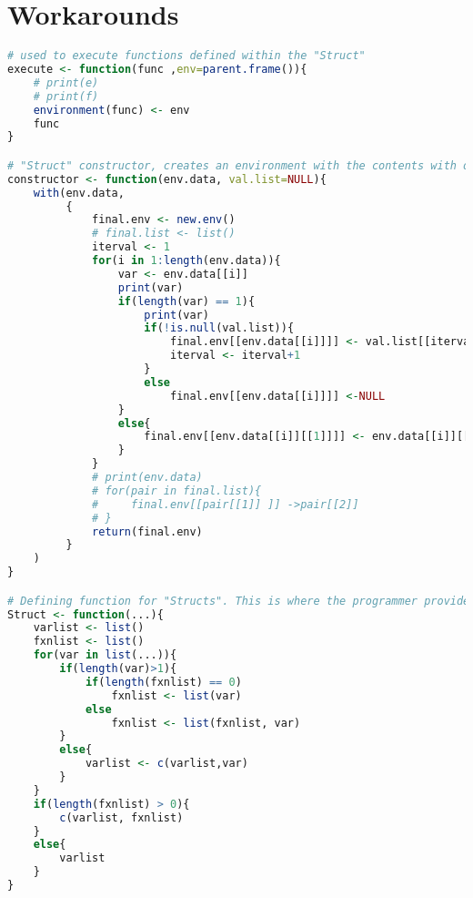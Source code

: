 \documentclass[12pt]{article}
\begin{document}
\section{Workarounds}
\begin{lstlisting}[language=R, frame=none]
# used to execute functions defined within the "Struct"
execute <- function(func ,env=parent.frame()){
    # print(e)
    # print(f)
    environment(func) <- env
    func
}

# "Struct" constructor, creates an environment with the contents with or without values
constructor <- function(env.data, val.list=NULL){
    with(env.data,
         {
             final.env <- new.env()
             # final.list <- list()
             iterval <- 1
             for(i in 1:length(env.data)){
                 var <- env.data[[i]]
                 print(var)
                 if(length(var) == 1){
                     print(var)
                     if(!is.null(val.list)){
                         final.env[[env.data[[i]]]] <- val.list[[iterval]]
                         iterval <- iterval+1
                     }
                     else
                         final.env[[env.data[[i]]]] <-NULL
                 }
                 else{
                     final.env[[env.data[[i]][[1]]]] <- env.data[[i]][[2]]
                 }
             }
             # print(env.data)
             # for(pair in final.list){
             #     final.env[[pair[[1]] ]] ->pair[[2]]
             # }
             return(final.env)
         }
    )
}

# Defining function for "Structs". This is where the programmer provides variable names and functions to be used.
Struct <- function(...){
    varlist <- list()
    fxnlist <- list()
    for(var in list(...)){
        if(length(var)>1){
            if(length(fxnlist) == 0)
                fxnlist <- list(var)
            else
                fxnlist <- list(fxnlist, var)
        }
        else{
            varlist <- c(varlist,var)
        }
    }
    if(length(fxnlist) > 0){
        c(varlist, fxnlist)
    }
    else{
        varlist
    }
}
\end{lstlisting}
\end{document}
